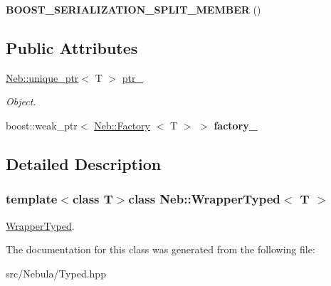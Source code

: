 \begin{DoxyCompactItemize}
\item 
\hypertarget{classNeb_1_1WrapperTyped_a68f3e137a2c358c596f4358c3a15d1f8}{{\bfseries \-B\-O\-O\-S\-T\-\_\-\-S\-E\-R\-I\-A\-L\-I\-Z\-A\-T\-I\-O\-N\-\_\-\-S\-P\-L\-I\-T\-\_\-\-M\-E\-M\-B\-E\-R} ()}\label{classNeb_1_1WrapperTyped_a68f3e137a2c358c596f4358c3a15d1f8}

\end{DoxyCompactItemize}
\subsection*{\-Public \-Attributes}
\begin{DoxyCompactItemize}
\item 
\hypertarget{classNeb_1_1WrapperTyped_a7d25b0d41e0b8400f47dd11615509fc6}{\hyperlink{classNeb_1_1unique__ptr}{\-Neb\-::unique\-\_\-ptr}$<$ \-T $>$ \hyperlink{classNeb_1_1WrapperTyped_a7d25b0d41e0b8400f47dd11615509fc6}{ptr\-\_\-}}\label{classNeb_1_1WrapperTyped_a7d25b0d41e0b8400f47dd11615509fc6}

\begin{DoxyCompactList}\small\item\em \-Object. \end{DoxyCompactList}\item 
\hypertarget{classNeb_1_1WrapperTyped_a07a4590d708916a3dc3c4ca6e1f913e3}{boost\-::weak\-\_\-ptr$<$ \hyperlink{classNeb_1_1Factory}{\-Neb\-::\-Factory}\*
$<$ \-T $>$ $>$ {\bfseries factory\-\_\-}}\label{classNeb_1_1WrapperTyped_a07a4590d708916a3dc3c4ca6e1f913e3}

\end{DoxyCompactItemize}


\subsection{\-Detailed \-Description}
\subsubsection*{template$<$class \-T$>$class Neb\-::\-Wrapper\-Typed$<$ T $>$}

\hyperlink{classNeb_1_1WrapperTyped}{\-Wrapper\-Typed}. 

\-The documentation for this class was generated from the following file\-:\begin{DoxyCompactItemize}
\item 
src/\-Nebula/\-Typed.\-hpp\end{DoxyCompactItemize}
